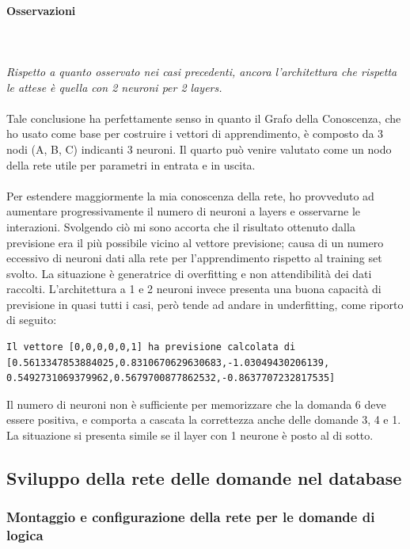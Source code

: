 \paragraph{Osservazioni}\mbox{}
\label{Osservazioni su rete a 4 neuroni per 1 layer}
\\\\
\noindent
\textit{Rispetto a quanto osservato nei casi precedenti, ancora l'architettura  che rispetta le attese \`e quella con 2 neuroni per 2 layers.}
\\\\
\noindent
Tale conclusione ha perfettamente senso in quanto il Grafo della Conoscenza, che ho usato come base per costruire i vettori di apprendimento, \`e composto da 3 nodi (A, B, C) indicanti 3 neuroni. Il quarto pu\`o venire valutato come un nodo della rete utile per parametri in entrata e in uscita.
\\\\
Per estendere maggiormente la mia conoscenza della rete, ho provveduto ad aumentare progressivamente il numero di neuroni a layers e osservarne le interazioni. Svolgendo ci\`o mi sono accorta che il risultato ottenuto dalla previsione era il pi\`u possibile vicino al vettore previsione; causa di un numero eccessivo di neuroni dati alla rete per l'apprendimento rispetto al training set svolto. La situazione \`e generatrice di overfitting e non attendibilit\`a dei dati raccolti.
L'architettura a 1 e 2 neuroni invece presenta una buona capacit\`a di previsione in quasi tutti i casi, per\`o tende ad andare in underfitting, come riporto di seguito:
\begin{verbatim}
Il vettore [0,0,0,0,0,1] ha previsione calcolata di
[0.5613347853884025,0.8310670629630683,-1.03049430206139,
0.5492731069379962,0.5679700877862532,-0.8637707232817535]
\end{verbatim}
Il numero di neuroni non \`e sufficiente per memorizzare che la domanda 6 deve essere positiva, e comporta a cascata la correttezza anche delle domande 3, 4 e 1. La situazione si presenta simile se il layer con 1 neurone \`e posto al di sotto.


\subsection{Sviluppo della rete delle domande nel database}
\label{Sviluppo della rete del database}

\subsubsection{Montaggio e configurazione della rete per le domande di logica}
\label{Montaggio e configurazione della rete per le domande di logica}

